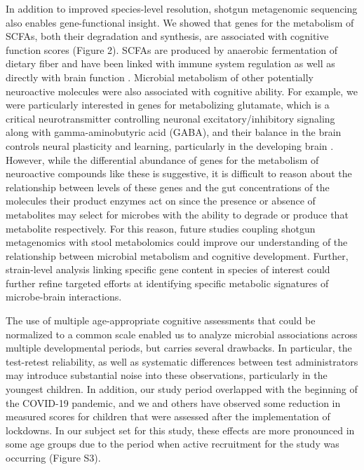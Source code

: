 \documentclass{article}
\begin{document}
In addition to improved species-level resolution, shotgun metagenomic
sequencing also enables gene-functional insight. We showed that
genes for the metabolism of SCFAs, both their degradation and synthesis,
are associated with cognitive function scores (Figure 2). 
SCFAs are produced by anaerobic fermentation of dietary fiber
and have been linked with immune system regulation as well as directly
with brain function \cite{dalileRoleShortchainFatty2019}.
Microbial metabolism of other potentially neuroactive molecules
were also associated with cognitive ability. For example, we were
particularly interested in genes for metabolizing glutamate, which is a
critical neurotransmitter controlling neuronal excitatory/inhibitory
signaling along with gamma-aminobutyric acid (GABA), and their balance
in the brain controls neural plasticity and learning, particularly in
the developing brain \cite{cohenkadoshLinkingGABAGlutamate2015,palomo-buitragoGlutamateInteractionsObesity2019}.
However, while the
differential abundance of genes for the metabolism of neuroactive
compounds like these is suggestive, it is difficult to reason about the
relationship between levels of these genes and the gut concentrations of
the molecules their product enzymes act on since the presence or absence
of metabolites may select for microbes with the ability to degrade
or produce that metabolite respectively.
For this reason, future studies coupling shotgun
metagenomics with stool metabolomics could improve our understanding of
the relationship between microbial metabolism and cognitive development.
Further, strain-level analysis linking specific gene content in species
of interest could further refine targeted efforts at identifying
specific metabolic signatures of microbe-brain interactions.

The use of multiple age-appropriate cognitive assessments that could be
normalized to a common scale enabled us to analyze microbial
associations across multiple developmental periods, but carries several
drawbacks. In particular, the test-retest reliability, as well as
systematic differences between test administrators may introduce
substantial noise into these observations, particularly in the youngest
children. In addition, our study period overlapped with the beginning of
the COVID-19 pandemic, and we and others have observed some reduction in
measured scores for children that were assessed after the implementation
of lockdowns. In our subject set for this study, these effects are more
pronounced in some age groups due to the period when active recruitment for
the study was occurring
\cite{blackwellYouthWellbeingCOVID192022,deoniImpactCOVID19Pandemic2021}
(Figure S3).
\end{document}
